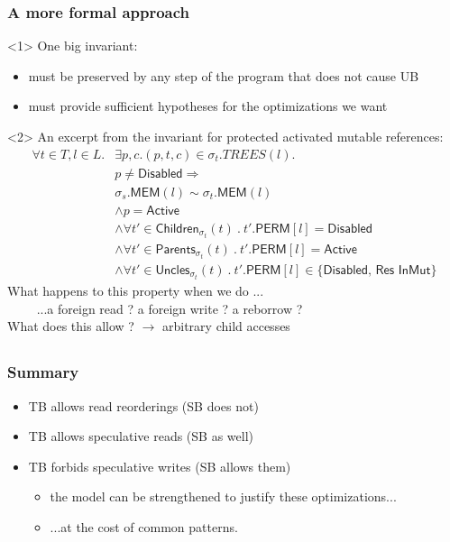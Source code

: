 \begin{frame}[fragile, t]
    \frametitle{A more formal approach}
    \begin{onlyenv}<1>
        One big invariant:
        \begin{itemize}
            \item must be preserved by any step of the program that does not cause UB
            \item must provide sufficient hypotheses for the optimizations we want
        \end{itemize}
    \end{onlyenv}
    \begin{onlyenv}<2>
        An excerpt from the invariant for protected activated mutable references:
        \begin{align*}
            \forall t \in T, l \in L . 
            & \exists p, c . (p, t, c) \in \sigma_t.TREES(l). \\
            & p \ne \textsf{Disabled} \Rightarrow \\
            & \sigma_s.\textsf{MEM}(l) \sim \sigma_t.\textsf{MEM}(l) \\
            & \wedge p = \textsf{Active} \\
            & \wedge \forall t' \in \textsf{Children}_{\sigma_t}(t)\ .\ t'.\textsf{PERM}[l] = \textsf{Disabled} \\
            & \wedge \forall t' \in \textsf{Parents}_{\sigma_t}(t)\ .\ t'.\textsf{PERM}[l] = \textsf{Active} \\
            & \wedge \forall t' \in \textsf{Uncles}_{\sigma_t}(t)\ .\ t'.\textsf{PERM}[l] \in \{\textsf{Disabled, Res InMut}\}
        \end{align*}
        What happens to this property when we do ... \\
        \( \qquad \) ...a foreign read ? a foreign write ? a reborrow ? \\
        What does this allow ? \( \to \) arbitrary child accesses
    \end{onlyenv}
\end{frame}

\subsection*{}

\begin{frame}
    \frametitle{Summary}
    \begin{itemize}
        \item TB allows read reorderings (SB does not)
        \item TB allows speculative reads (SB as well)
        \item TB forbids speculative writes (SB allows them)
            \begin{itemize}
                \item the model can be strengthened to justify these optimizations...
                \item ...at the cost of common patterns.
            \end{itemize}
    \end{itemize}
\end{frame}
